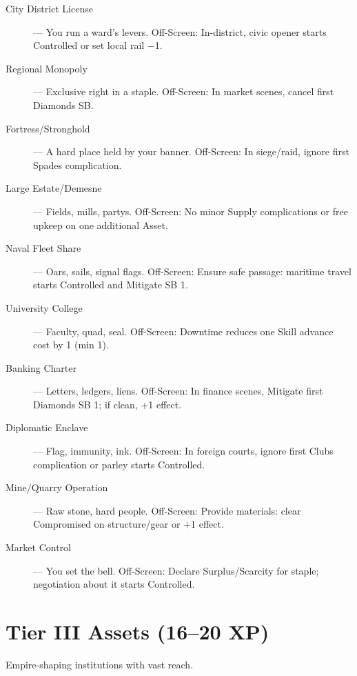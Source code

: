 \begin{description}
  \item[City District License] — You run a ward's levers. Off-Screen: In-district, civic opener starts Controlled or set local rail −1.
  \item[Regional Monopoly] — Exclusive right in a staple. Off-Screen: In market scenes, cancel first Diamonds SB.
  \item[Fortress/Stronghold] — A hard place held by your banner. Off-Screen: In siege/raid, ignore first Spades complication.
  \item[Large Estate/Demesne] — Fields, mills, partys. Off-Screen: No minor Supply complications or free upkeep on one additional Asset.
  \item[Naval Fleet Share] — Oars, sails, signal flags. Off-Screen: Ensure safe passage: maritime travel starts Controlled and Mitigate SB 1.
  \item[University College] — Faculty, quad, seal. Off-Screen: Downtime reduces one Skill advance cost by 1 (min 1).
  \item[Banking Charter] — Letters, ledgers, liens. Off-Screen: In finance scenes, Mitigate first Diamonds SB 1; if clean, +1 effect.
  \item[Diplomatic Enclave] — Flag, immunity, ink. Off-Screen: In foreign courts, ignore first Clubs complication or parley starts Controlled.
  \item[Mine/Quarry Operation] — Raw stone, hard people. Off-Screen: Provide materials: clear Compromised on structure/gear or +1 effect.
  \item[Market Control] — You set the bell. Off-Screen: Declare Surplus/Scarcity for staple; negotiation about it starts Controlled.
\end{description}

\section{Tier III Assets (16–20 XP)}

Empire-shaping institutions with vast reach.

